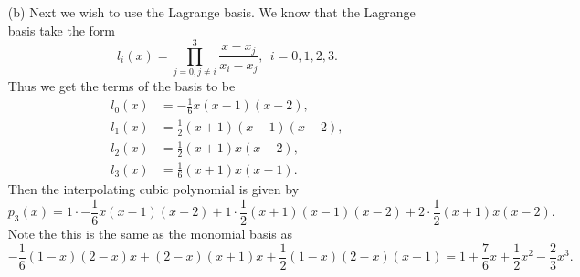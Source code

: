 \documentclass[12pt]{report}
\begin{document}
\begin{solution}
\begin{enumerate}
        \item [(b)] Next we wish to use the Lagrange basis. We know that the Lagrange basis take the form
        \[ 
            l_i(x) = \prod_{j=0,j\neq i}^3 \frac{x - x_j}{x_i - x_j}, ~~ i = 0,1,2,3.
        \] 
        Thus we get the terms of the basis to be
        \begin{align*}
            l_0(x) &= -\frac{1}{6} x (x-1) (x-2),\\
            l_1(x) &= \frac{1}{2} (x+1)(x-1) (x-2),\\
            l_2(x) &= \frac{1}{2} (x+1)x(x-2), \\
            l_3(x) &= \frac{1}{6} (x+1)x(x-1).
        \end{align*}
        Then the interpolating cubic polynomial is given by
        \[ 
            p_3(x) = 1 \cdot -\frac{1}{6} x (x-1) (x-2) + 1 \cdot \frac{1}{2} (x+1)(x-1) (x-2) + 2 \cdot\frac{1}{2} (x+1)x(x-2).
        \]
        Note the this is the same as the monomial basis as
        \[ 
            -\frac{1}{6} (1-x) (2-x) x+(2-x) (x+1) x+\frac{1}{2} (1-x) (2-x) (x+1) = 1 + \frac{7}{6}x + \frac{1}{2}x^2 - \frac{2}{3}x^3.
        \]



\end{enumerate}
\end{solution}
\end{document}

